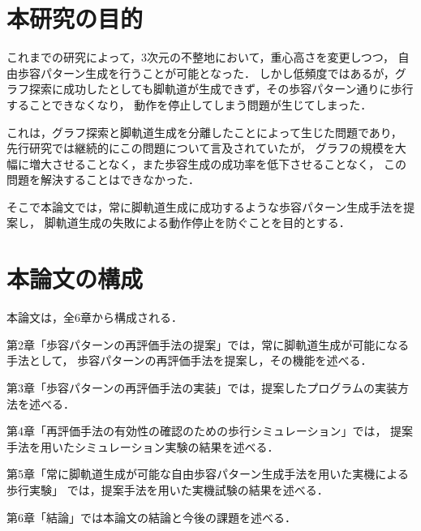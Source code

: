 \section{本研究の目的}
これまでの研究によって，3次元の不整地において，重心高さを変更しつつ，
自由歩容パターン生成を行うことが可能となった．
しかし低頻度ではあるが，グラフ探索に成功したとしても脚軌道が生成できず，その歩容パターン通りに歩行することできなくなり，
動作を停止してしまう問題が生じてしまった．

これは，グラフ探索と脚軌道生成を分離したことによって生じた問題であり，
先行研究では継続的にこの問題について言及されていたが，
グラフの規模を大幅に増大させることなく，また歩容生成の成功率を低下させることなく，
この問題を解決することはできなかった．

そこで本論文では，常に脚軌道生成に成功するような歩容パターン生成手法を提案し，
脚軌道生成の失敗による動作停止を防ぐことを目的とする．

\section{本論文の構成}
本論文は，全6章から構成される．

第2章「歩容パターンの再評価手法の提案」では，常に脚軌道生成が可能になる手法として，
歩容パターンの再評価手法を提案し，その機能を述べる．

第3章「歩容パターンの再評価手法の実装」では，提案したプログラムの実装方法を述べる．

第4章「再評価手法の有効性の確認のための歩行シミュレーション」では，
提案手法を用いたシミュレーション実験の結果を述べる．

第5章「常に脚軌道生成が可能な自由歩容パターン生成手法を用いた実機による歩行実験」
では，提案手法を用いた実機試験の結果を述べる．

第6章「結論」では本論文の結論と今後の課題を述べる．
